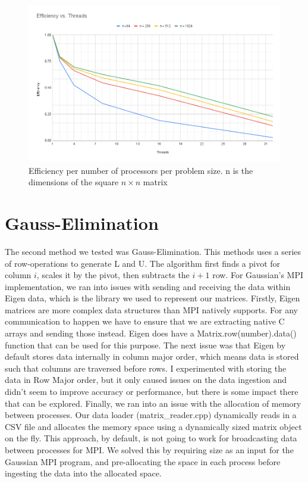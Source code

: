 \documentclass[12pt,letterpaper]{article}
\begin{document}
\begin{figure}[H]
    \centering
    \includegraphics[width=0.9\linewidth]{"Efficiency vs. Threads"}
    \caption{Efficiency per number of processors per problem size. n is the dimensions of the square \(n \times n\) matrix}
    \label{fig:efficiency-vs}
\end{figure}


\section{Gauss-Elimination}
The second method we tested was Gauss-Elimination. This methods uses a series of row-operations to generate L and U.  The algorithm first finds a pivot for column \(i\), scales it by the pivot, then subtracts the \(i+1\) row. For Gaussian's MPI implementation, we ran into issues with sending and receiving the data within Eigen data, which is the library we used to represent our matrices. Firstly, Eigen matrices are more complex data structures than MPI natively supports. For any communication to happen we have to ensure that we are extracting native C arrays and sending those instead. Eigen does have a Matrix.row(number).data() function that can be used for this purpose. The next issue was that Eigen by default stores data internally in column major order, which means data is stored such that columns are traversed before rows. I experimented with storing the data in Row Major order, but it only caused issues on the data ingestion and didn't seem to improve accuracy or performance, but there is some impact there that can be explored. Finally, we ran into an issue with the allocation of memory between processes. Our data loader (matrix\_reader.cpp) dynamically reads in a CSV file and allocates the memory space using a dynamically sized matrix object on the fly. This approach, by default, is not going to work for broadcasting data between processes for MPI. We solved this by requiring size as an input for the Gaussian MPI program, and pre-allocating the space in each process before ingesting the data into the allocated space.
\end{document}
